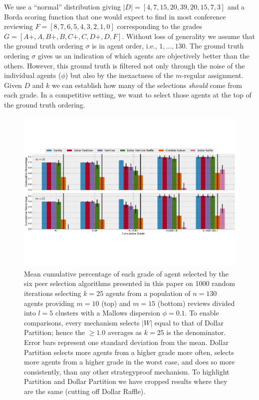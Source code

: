 \documentclass[letterpaper]{article}
\begin{document}
We use a ``normal'' distribution %
giving $|D| = [4, 7, 15, 20, 39, 20, 15, 7, 3]$
and a Borda scoring function that one would expect to find in most conference reviewing
$F = [8, 7, 6, 5, 4, 3, 2, 1, 0]$ corresponding to the grades $G = [A+, A, B+, B, C+, C, D+, D, F]$. Without loss of generality we assume that the ground truth ordering $\sigma$ is in agent order, i.e., $1, \ldots, 130$.
The ground truth ordering $\sigma$ gives us an indication of which agents are objectively better
than the others. However, this ground truth is filtered not only through the noise of the individual
agents ($\phi$) but also by the inexactness of the $m$-regular assignment. Given $D$ and $k$ we can
establish how many of the selections \emph{should} come from each grade.
In a competitive setting, we want to select those agents at the top of the ground truth ordering.

\begin{figure}[!ht]
\centering
\includegraphics[width=.8\textwidth]{./cumulative_grade_big-emb}
\caption{Mean cumulative percentage of each grade of agent selected by the six peer selection algorithms presented in this paper on 1000 random iterations selecting $k=25$ agents from a population of $n=130$ agents providing $m=10$ (top) and $m=15$ (bottom) reviews divided into $l=5$ clusters with a Mallows dispersion $\phi = 0.1$. To enable comparisons, every mechanism selects $|W|$ equal to that of Dollar Partition; hence the $\geq 1.0$ averages as $k=25$ is the denominator.
Error bars represent one standard deviation from the mean.
Dollar Partition selects more agents from a higher grade more often, selects more agents from a higher grade in the worst case, and does so more consistently, than any other strategyproof mechanism. To highlight Partition and Dollar Partition we have cropped results where they are the same (cutting off Dollar Raffle).}\label{fig:results}
\end{figure}
\end{document}
